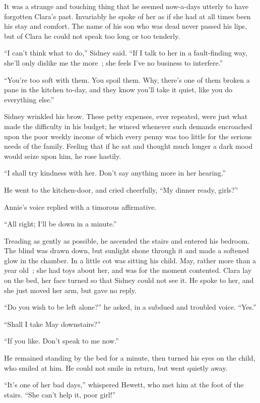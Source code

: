 It was a strange and touching thing that he seemed now-a-days utterly to
have forgotten Clara's past. Invariably he spoke of her as if she had at
all times been his stay and comfort. The name of his son who was dead
never passed his lips, but of Clara he could not speak too long or too
tenderly.

``I can't think what to do,'' Sidney said. ``If I talk to her in a
fault-finding way, she'll only dislike me the more~; she feels I've no
business to interfere.''

``You're too soft with them. You spoil them. Why, there's one of them
broken a pane in the kitchen to-day, and they know you'll take it quiet,
like you do everything else.''

Sidney wrinkled his brow. These petty expenses, ever repeated, were just
what made {\protect\hypertarget{267}{}{}} the difficulty in his budget;
he winced whenever such demands encroached upon the poor weekly income
of which every penny was too little for the serious needs of the family.
Feeling that if he sat and thought much longer a dark mood would seize
upon him, he rose hastily.

``I shall try kindness with her. Don't say anything more in her
hearing.''

He went to the kitchen-door, and cried cheerfully, ``My dinner ready,
girls?''

Annie's voice replied with a timorous affirmative.

``All right; I'll be down in a minute.''

Treading as gently as possible, he ascended the stairs and entered his
bedroom. The blind was drawn down, but sunlight shone through it and
made a softened glow in the chamber. In a little cot was sitting his
child. May, rather more than a year old~; she had toys about her, and
was for the moment contented. Clara lay on the bed, her face turned so
that Sidney could not see it. He spoke to her, and she just moved her
arm, but gave no reply.

``Do you wish to be left alone?'' he asked, in a subdued and troubled
voice. {\protect\hypertarget{268}{}{}}``Yes.''

``Shall I take May downstairs?''

``If you like. Don't speak to me now.''

He remained standing by the bed for a minute, then turned his eyes on
the child, who smiled at him. He could not smile in return, but went
quietly away.

``It's one of her bad days,'' whispered Hewett, who met him at the foot
of the stairs. ``She can't help it, poor girl!''

